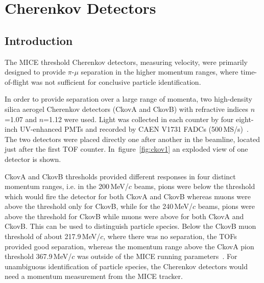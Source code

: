 \graphicspath{{03-Ckov/Figures/}}

\section{Cherenkov Detectors}
\label{Sect:Ckov}

\subsection{Introduction}
\label{SubSect:Ckov_Intro}

The MICE threshold Cherenkov detectors, measuring velocity, were primarily designed to provide $\pi$-$\mu$ separation in the higher momentum ranges, where time-of-flight was not sufficient for conclusive particle identification.

In order to provide separation over a large range of momenta, two high-density silica aerogel Cherenkov detectors (CkovA and CkovB) with refractive indices $n$=1.07 and $n$=1.12 were used.
Light was collected in each counter by four eight-inch UV-enhanced PMTs and recorded by CAEN V1731 FADCs (500\,MS/s)~\cite{NOTE473}.
The two detectors were placed directly one after another in the beamline, located just after the first TOF counter. In~figure~\ref{fig:ckov1} an exploded view of one detector is shown.

CkovA and CkovB thresholds provided different responses in four distinct momentum ranges, i.e. in the 200\,MeV/$c$ beams, pions were below the threshold which would fire the detector for both CkovA and CkovB whereas muons were above the threshold only for CkovB, while for the 240\,MeV/$c$ beams, pions were above the threshold for CkovB while muons were above for both CkovA and CkovB.
This can be used to distinguish particle species.
Below the CkovB muon threshold of about 217.9\,MeV/$c$, where there was no separation, the TOFs provided good separation, whereas the momentum range above the CkovA pion threshold 367.9\,MeV/$c$ was outside of the MICE running parameters~\cite{NOTE473}.
For unambiguous identification of particle species, the Cherenkov detectors would need a momentum measurement from the MICE tracker.

